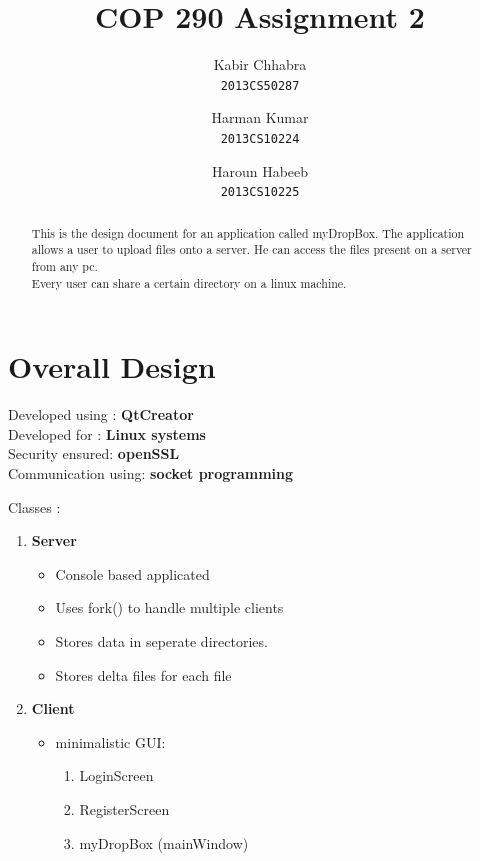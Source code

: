 \documentclass[]{article}
\begin{document}
\author{
  Kabir Chhabra\\
  \texttt{2013CS50287}
  \and
  Harman Kumar\\
  \texttt{2013CS10224}
  \and  
  Haroun Habeeb\\
  \texttt{2013CS10225}
}
\title{COP 290 Assignment 2}
\maketitle



\begin{abstract}
This is the design document for an application called myDropBox. The application allows a user to upload files onto a server. He can access the files present on a server from any pc. \\
Every user can share a certain directory on a linux machine.
\end{abstract}

\section{Overall Design}
\begin{center}
Developed using : \textbf{QtCreator} \\
Developed for   : \textbf{Linux systems}\\
Security ensured: \textbf{openSSL}\\
Communication using: \textbf{socket programming}\\
\end{center} 

Classes :
\begin{enumerate}
\item \textbf{Server}
\begin{itemize}
\item Console based applicated
\item Uses fork() to handle multiple clients
\item Stores data in seperate directories.
\item Stores delta files for each file
\end{itemize}
\item \textbf{Client}
\begin{itemize}
\item minimalistic GUI:
\begin{enumerate}
\item LoginScreen
\item RegisterScreen
\item myDropBox (mainWindow)
\end{enumerate}
\end{itemize}

\end{enumerate}
\end{document}
